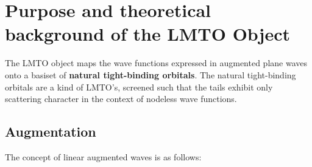\documentclass[11pt,a4paper]{report}
\begin{document}
\chapter{Purpose and theoretical background of the LMTO Object}
The LMTO object maps the wave functions expressed in augmented plane
waves onto a basiset of \textbf{natural tight-binding
  orbitals}. The natural
tight-binding orbitals are a kind of LMTO's, screened such that the
tails exhibit only scattering character in the context of nodeless
wave functions\cite{bloechl12_arxiv1210_5937}.

\section{Augmentation}
The concept of linear augmented waves\cite{andersen75_prb12_3060} is
as follows:
\end{document}
